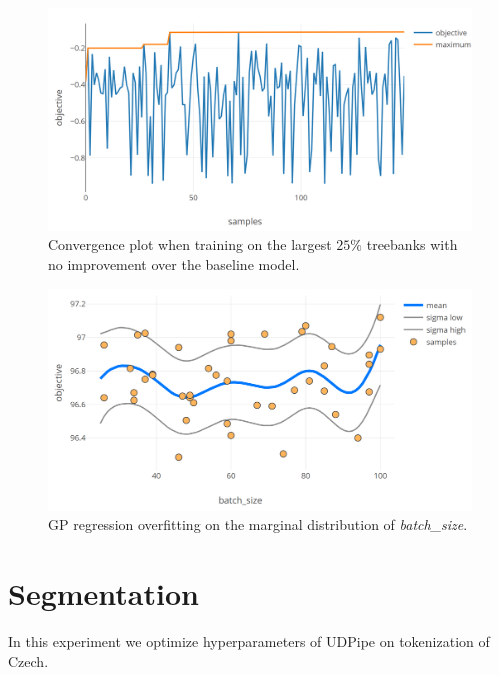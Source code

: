 \begin{figure}
	\begin{center}
		\includegraphics[width=1\textwidth]{images/sig-large-convergence.png}
		\caption{Convergence plot when training on the largest $25\%$ treebanks with no improvement over the baseline model.}
		\label{figure:sig-large-convergence}
	\end{center}
\end{figure}


\begin{figure}
	\begin{center}
		\includegraphics[width=1\textwidth]{images/tokenizer-overfitting-batch-size.png}
		\caption{GP regression overfitting on the marginal distribution of \emph{batch\_size}.}
		\label{figure:gp-overfitting-batch-size}
	\end{center}
\end{figure}

\clearpage
\section{Segmentation}

In this experiment we optimize hyperparameters of UDPipe \citep{udpipe:2017} on
tokenization of Czech.

